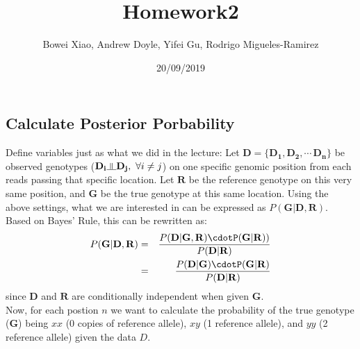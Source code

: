 \documentclass[]{article}
\title{Homework2}
\author{Bowei Xiao, Andrew Doyle, Yifei Gu, Rodrigo Migueles-Ramirez}
\date{20/09/2019}
\begin{document}
\maketitle

\newcommand{\indep}{\rotatebox[origin=c]{90}{$\models$}}

\hypertarget{calculate-posterior-porbability}{%
\subsection{Calculate Posterior
Porbability}\label{calculate-posterior-porbability}}

Define variables just as what we did in the lecture: Let
\(\mathbf{D}=\{\mathbf{D_1},\mathbf{D_2},\cdots\,\mathbf{D_n}\}\) be
observed genotypes
(\(\mathbf{D_i}\rotatebox[origin=c]{90}{$\models$}\mathbf{D_j},\ \forall i\ne j\))
on one specific genomic position from each reads passing that specific
location. Let \(\mathbf{R}\) be the reference genotype on this very same
position, and \(\mathbf{G}\) be the true genotype at this same location.
Using the above settings, what we are interested in can be expressed as
\(P(\mathbf{G|D,R})\). Based on Bayes' Rule, this can be rewritten as:
\begin{eqnarray*}
P(\mathbf{G|D,R})&=&\frac{P(\mathbf{D|G,R)}\cdotP(\mathbf{G|R}))}{P(\mathbf{D|R})} \\
&=& \frac{P(\mathbf{D|G})\cdotP(\mathbf{G|R})}{P(\mathbf{D|R})}
\end{eqnarray*} since \(\mathbf{D}\) and \(\mathbf{R}\) are
conditionally independent when given \(\mathbf{G}\).\\
Now, for each postion \(n\) we want to calculate the probability of the
true genotype (\(\mathbf{G}\)) being \(xx\) (0 copies of reference
allele), \(xy\) (1 reference allele), and \(yy\) (2 reference allele)
given the data \(D\).
\end{document}
